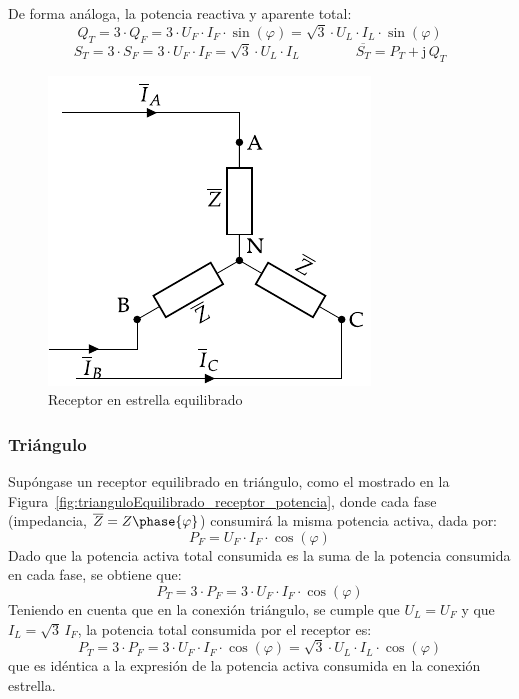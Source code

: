 	
	De forma análoga, la potencia reactiva y aparente total:
	\begin{equation}
	    \boxed{Q_T=3\cdot Q_F=3\cdot U_F\cdot {I_F}\cdot\sin(\varphi)=\sqrt{3}\cdot U_L\cdot I_L\cdot\sin(\varphi)}
	\end{equation}
	\begin{equation}
	    \boxed{S_T=3\cdot S_F=3\cdot U_F\cdot {I_F}=\sqrt{3}\cdot U_L\cdot I_L}\qquad\qquad \boxed{\overline{S_T}=P_T+\mathrm{j}\,Q_T}
	\end{equation}
	
	\begin{figure}
	    \centering
	    \includegraphics{../figs/EstrellaEquilibrado_Receptor_SN.pdf}
	    \caption{Receptor en estrella equilibrado}
	    \label{fig:estrellaequilibrado_SN_potencia}
	\end{figure}
	
	\subsubsection{Triángulo}
	
	Supóngase un receptor equilibrado en triángulo, como el mostrado en la Figura~\ref{fig:trianguloEquilibrado_receptor_potencia}, donde cada fase (impedancia, $\overline{Z}=Z\phase{\varphi}$) consumirá la misma potencia activa, dada por: 
	\begin{equation*}
	    P_F=U_{F}\cdot I_F \cdot \cos(\varphi)
	\end{equation*}
	Dado que la potencia activa total consumida es la suma de la potencia consumida en cada fase, se obtiene que:
	\begin{equation*}
	    P_T=3\cdot P_F=3\cdot U_F\cdot I_F\cdot\cos(\varphi)
	\end{equation*}
	Teniendo en cuenta que en la conexión triángulo, se cumple que $U_L=U_F$ y que $I_L=\sqrt{3}\,I_F$, la potencia total consumida por el receptor es: 
	\begin{equation}
	    \boxed{P_T=3\cdot P_F=3\cdot U_F\cdot {I_F}\cdot\cos(\varphi)=\sqrt{3}\cdot U_L\cdot I_L\cdot\cos(\varphi)}
	\end{equation}
	que es idéntica a la expresión de la potencia activa consumida en la conexión estrella.
	
